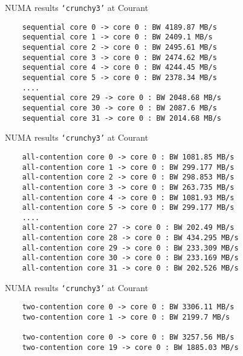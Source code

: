 \documentclass[english,compress]{beamer}
\begin{document}
\begin{frame}[fragile]{NUMA results}
  \texttt{`crunchy3'} at Courant

  \medskip
  \begin{lstlisting}
    sequential core 0 -> core 0 : BW 4189.87 MB/s
    sequential core 1 -> core 0 : BW 2409.1 MB/s
    sequential core 2 -> core 0 : BW 2495.61 MB/s
    sequential core 3 -> core 0 : BW 2474.62 MB/s
    sequential core 4 -> core 0 : BW 4244.45 MB/s
    sequential core 5 -> core 0 : BW 2378.34 MB/s
    ....
    sequential core 29 -> core 0 : BW 2048.68 MB/s
    sequential core 30 -> core 0 : BW 2087.6 MB/s
    sequential core 31 -> core 0 : BW 2014.68 MB/s
  \end{lstlisting}
\end{frame}
\begin{frame}[fragile]{NUMA results}
  \texttt{`crunchy3'} at Courant

  \medskip
  \begin{lstlisting}
    all-contention core 0 -> core 0 : BW 1081.85 MB/s
    all-contention core 1 -> core 0 : BW 299.177 MB/s
    all-contention core 2 -> core 0 : BW 298.853 MB/s
    all-contention core 3 -> core 0 : BW 263.735 MB/s
    all-contention core 4 -> core 0 : BW 1081.93 MB/s
    all-contention core 5 -> core 0 : BW 299.177 MB/s
    ....
    all-contention core 27 -> core 0 : BW 202.49 MB/s
    all-contention core 28 -> core 0 : BW 434.295 MB/s
    all-contention core 29 -> core 0 : BW 233.309 MB/s
    all-contention core 30 -> core 0 : BW 233.169 MB/s
    all-contention core 31 -> core 0 : BW 202.526 MB/s
  \end{lstlisting}
\end{frame}
\begin{frame}[fragile]{NUMA results}
  \texttt{`crunchy3'} at Courant

  \medskip
  \begin{lstlisting}
    two-contention core 0 -> core 0 : BW 3306.11 MB/s
    two-contention core 1 -> core 0 : BW 2199.7 MB/s

    two-contention core 0 -> core 0 : BW 3257.56 MB/s
    two-contention core 19 -> core 0 : BW 1885.03 MB/s
  \end{lstlisting}
\end{frame}


\questionframe{}
\imagecreditslide
\end{document}
